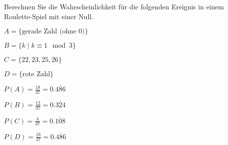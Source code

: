 Berechnen Sie die Wahrscheinlichkeit für die folgenden Ereignis in
einem Roulette-Spiel mit einer Null.
\begin{teilaufgaben}
\item
$A=\{\text{gerade Zahl (ohne $0$)}\}$
\item
$B=\{k\mid k\equiv 1\mod 3\}$
\item
$C=\{22,23,25,26\}$
\item
$D=\{\text{rote Zahl}\}$
\end{teilaufgaben}

\begin{loesung}
\begin{teilaufgaben}
\item
$P(A) = \frac{18}{37} = 0.\overline{486}$
\item
$P(B) = \frac{12}{37} = 0.\overline{324}$
\item
$P(C) = \frac{4}{37} = 0.\overline{108}$
\item
$P(D) = \frac{18}{37} = 0.\overline{486}$
\qedhere
\end{teilaufgaben}
\end{loesung}

